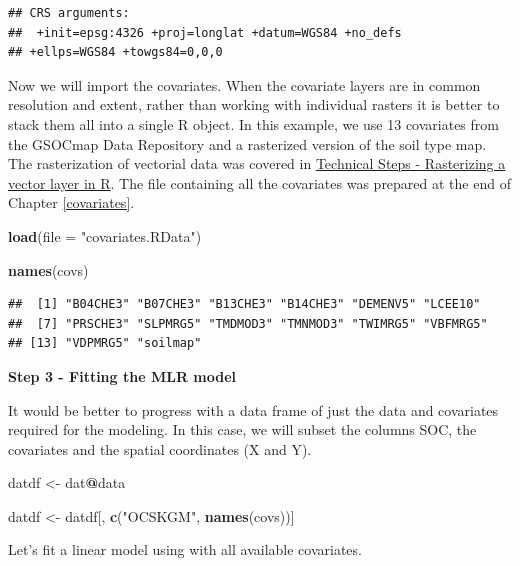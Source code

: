 \documentclass[10pt,b5paper,]{book}
\newenvironment{Shaded}{\begin{snugshade}}{\end{snugshade}}
\newcommand{\DataTypeTok}[1]{\textcolor[rgb]{0.13,0.29,0.53}{#1}}
\newcommand{\KeywordTok}[1]{\textcolor[rgb]{0.13,0.29,0.53}{\textbf{#1}}}
\newcommand{\NormalTok}[1]{#1}
\newcommand{\OperatorTok}[1]{\textcolor[rgb]{0.81,0.36,0.00}{\textbf{#1}}}
\newcommand{\StringTok}[1]{\textcolor[rgb]{0.31,0.60,0.02}{#1}}
\theoremstyle{definition}
\theoremstyle{definition}
\theoremstyle{definition}
\theoremstyle{remark}
\begin{document}
\begin{verbatim}
## CRS arguments:
##  +init=epsg:4326 +proj=longlat +datum=WGS84 +no_defs
## +ellps=WGS84 +towgs84=0,0,0
\end{verbatim}

Now we will import the covariates. When the covariate layers are in
common resolution and extent, rather than working with individual
rasters it is better to stack them all into a single R object. In this
example, we use 13 covariates from the GSOCmap Data Repository and a
rasterized version of the soil type map. The rasterization of vectorial
data was covered in
\protect\hyperlink{technical-steps---rasterizing-a-vector-layer-in-r}{Technical
Steps - Rasterizing a vector layer in R}. The file containing all the
covariates was prepared at the end of Chapter \ref{covariates}.

\begin{Shaded}
\begin{Highlighting}[]
\KeywordTok{load}\NormalTok{(}\DataTypeTok{file =} \StringTok{"covariates.RData"}\NormalTok{)}

\KeywordTok{names}\NormalTok{(covs)}
\end{Highlighting}
\end{Shaded}

\begin{verbatim}
##  [1] "B04CHE3" "B07CHE3" "B13CHE3" "B14CHE3" "DEMENV5" "LCEE10" 
##  [7] "PRSCHE3" "SLPMRG5" "TMDMOD3" "TMNMOD3" "TWIMRG5" "VBFMRG5"
## [13] "VDPMRG5" "soilmap"
\end{verbatim}

\textbf{Step 3 - Fitting the MLR model}

It would be better to progress with a data frame of just the data and
covariates required for the modeling. In this case, we will subset the
columns SOC, the covariates and the spatial coordinates (X and Y).

\begin{Shaded}
\begin{Highlighting}[]
\NormalTok{datdf <-}\StringTok{ }\NormalTok{dat}\OperatorTok{@}\NormalTok{data}

\NormalTok{datdf <-}\StringTok{ }\NormalTok{datdf[, }\KeywordTok{c}\NormalTok{(}\StringTok{"OCSKGM"}\NormalTok{, }\KeywordTok{names}\NormalTok{(covs))]}
\end{Highlighting}
\end{Shaded}

Let's fit a linear model using with all available covariates.
\end{document}
